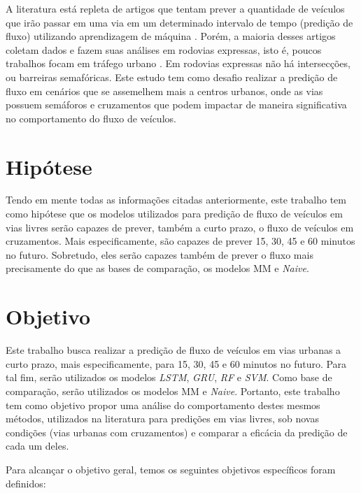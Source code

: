 A literatura está repleta de artigos que tentam prever a quantidade de veículos que irão passar em uma via em um determinado intervalo de tempo (predição de fluxo) utilizando aprendizagem de máquina \cite{doi:10.1080/01441647.2014.992496, fu2016using, hamed_prediction_1995, lv_6894591, Seoul, wang_2018, Xiaolei_2015, Zainab_2018}. Porém, a maioria desses artigos coletam dados e fazem suas análises em rodovias expressas, isto é, poucos trabalhos focam em tráfego urbano \cite{lana_2018}. Em rodovias expressas não há intersecções, ou barreiras semafóricas. Este estudo tem como desafio realizar a predição de fluxo em cenários que se assemelhem mais a centros urbanos, onde as vias possuem semáforos e cruzamentos que podem impactar de maneira significativa no comportamento do fluxo de veículos.

\section{Hipótese}

Tendo em mente todas as informações citadas anteriormente, este trabalho tem como hipótese que os modelos utilizados para predição de fluxo de veículos em vias livres serão capazes de prever, também a curto prazo, o fluxo de veículos em cruzamentos. Mais especificamente, são capazes de prever 15, 30, 45 e 60 minutos no futuro. Sobretudo, eles serão capazes também de prever o fluxo mais precisamente do que as bases de comparação, os modelos \acrfull{MM} e \textit{Naive}.

\section{Objetivo}

Este trabalho busca realizar a predição de fluxo de veículos em vias urbanas a curto prazo, mais especificamente, para 15, 30, 45 e 60 minutos no futuro. Para tal fim, serão utilizados os modelos \textit{\acrfull{LSTM}}, \textit{\acrfull{GRU}}, \textit{\acrfull{RF}} e \textit{\acrfull{SVM}}. Como base de comparação, serão utilizados os modelos \acrfull{MM} e \textit{Naive}. Portanto, este trabalho tem como objetivo propor uma análise do comportamento destes mesmos métodos, utilizados na literatura para predições em vias livres, sob novas condições (vias urbanas com cruzamentos) e comparar a eficácia da predição de cada um deles.

Para alcançar o objetivo geral, temos os seguintes objetivos específicos foram definidos:

